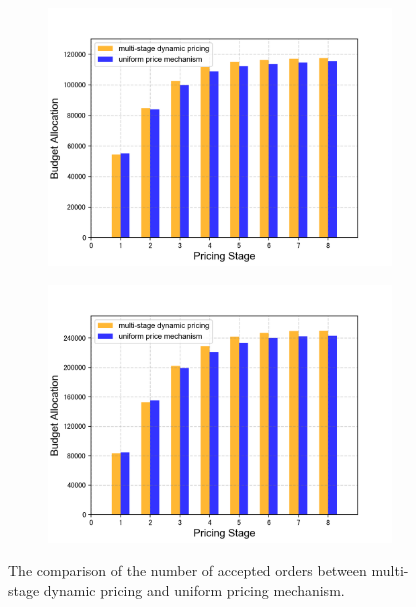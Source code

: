 \documentclass[sigconf,authordraft]{acmart}
\begin{document}
\begin{figure}[tb]
    \begin{subfigure}[b]{0.2\textwidth}
    \includegraphics[width=\textwidth]{m-pricing2-c.png}
    \end{subfigure}
    \begin{subfigure}[b]{0.2\textwidth}
    \qquad
    \includegraphics[width=\textwidth]{m-pricing2-d.png}
    \end{subfigure}
    \caption{The comparison of the number of accepted orders between multi-stage dynamic pricing and uniform pricing mechanism.}
    \label{fig:m-pricing2}
\end{figure}
\end{document}
